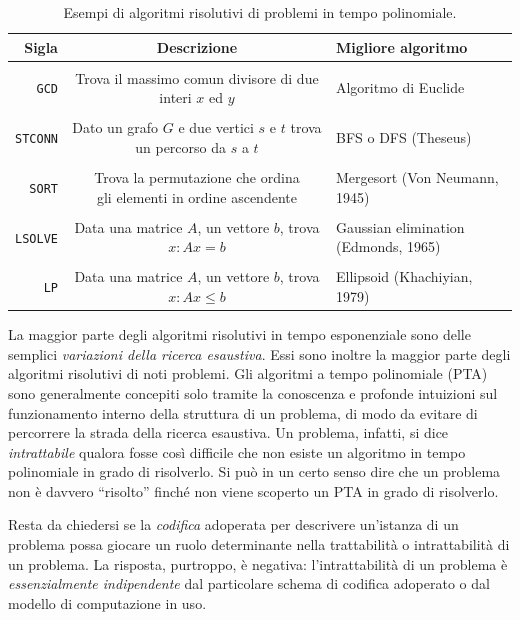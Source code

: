 \documentclass[10pt]{\classname}
\theoremstyle{newlinethm}
\theoremstyle{theorem}
\theoremstyle{definition}
\theoremstyle{definition}
\theoremstyle{definition}
\theoremstyle{definition}
\begin{document}
\begin{table}[ht]
\centering
\begin{tabular}{rcl}
    \textbf{Sigla} & \textbf{Descrizione} & \textbf{Migliore algoritmo} \\
    \hline
    \\
    \texttt{GCD} & \makecell{Trova il massimo comun divisore \\ di due interi $x$ ed $y$} & Algoritmo di Euclide \\
    \\
    \texttt{STCONN} & \makecell{Dato un grafo $G$ e due vertici $s$ e $t$ \\ trova un percorso da $s$ a $t$} & BFS o DFS (Theseus) \\
    \\
    \texttt{SORT} & \makecell{Trova la permutazione che ordina \\ gli elementi in ordine ascendente} & Mergesort (Von Neumann, 1945) \\
    \\
    \texttt{LSOLVE} & \makecell{Data una matrice $A$, un vettore $b$, \\ trova $x:Ax=b$} & Gaussian elimination (Edmonds, 1965) \\
    \\
    \texttt{LP} & \makecell{Data una matrice $A$, un vettore $b$, \\ trova $x:Ax\leq b$} & Ellipsoid (Khachiyian, 1979)
    \\
\end{tabular}
\caption{Esempi di algoritmi risolutivi di problemi in tempo polinomiale.}\label{tab:polynomial-time-problems}
\end{table}
\bigskip

La maggior parte degli algoritmi risolutivi in tempo esponenziale sono delle semplici \emph{variazioni della ricerca esaustiva}. Essi sono inoltre la maggior parte degli algoritmi risolutivi di noti problemi. Gli algoritmi a tempo polinomiale (PTA) sono generalmente concepiti solo tramite la conoscenza e profonde intuizioni sul funzionamento interno della struttura di un problema, di modo da evitare di percorrere la strada della ricerca esaustiva. Un problema, infatti, si dice \emph{intrattabile} qualora fosse così difficile che non esiste un algoritmo in tempo polinomiale in grado di risolverlo. Si può in un certo senso dire che un problema non è davvero ``risolto'' finché non viene scoperto un PTA in grado di risolverlo.

Resta da chiedersi se la \emph{codifica} adoperata per descrivere un'istanza di un problema possa giocare un ruolo determinante nella trattabilità o intrattabilità di un problema. La risposta, purtroppo, è negativa: l'intrattabilità di un problema è \emph{essenzialmente indipendente} dal particolare schema di codifica adoperato o dal modello di computazione in uso.
\end{document}
